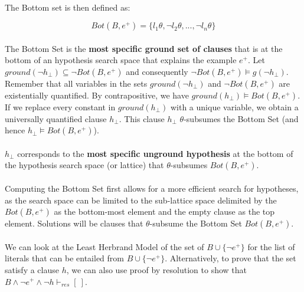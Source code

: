 \documentclass{article}
\theoremstyle{plain}
\theoremstyle{definition}
\begin{document}
\begin{multicols}{2}
\paragraph{} The Bottom set is then defined as:

$$Bot(B, e^+) = \{l_1\theta, \lnot l_2\theta, ..., \lnot l_n\theta\}$$

\paragraph{} The Bottom Set is the \textbf{most specific ground set of clauses} that is at the bottom of an hypothesis search space that explains the example $e^+$. Let $ground(\lnot h_{\perp}) \subseteq \lnot Bot(B, e^+)$ and consequently $\lnot Bot(B, e^+) \models g(\lnot h_{\perp})$. Remember that all variables in the sets $ground(\lnot h_{\perp})$ and $\lnot Bot(B, e^+)$ are existentially quantified. By contrapositive, we have $ground(h_{\perp}) \models Bot(B, e^+)$. If we replace every constant in $ground(h_{\perp})$ with a unique variable, we obtain a universally quantified clause $h_{\perp}$. This clause $h_{\perp}$ $\theta$-subsumes the Bottom Set (and hence $h_{\perp} \models Bot(B, e^+)$).

\paragraph{} $h_{\perp}$ corresponds to the \textbf{most specific unground hypothesis} at the bottom of the hypothesis search space (or lattice) that $\theta$-subsumes $Bot(B, e^+)$. 

\paragraph{} Computing the Bottom Set first allows for a more efficient search for hypotheses, as the search space can be limited to the sub-lattice space delimited by the $Bot(B, e^+)$ as the bottom-most element and the empty clause as the top element. Solutions will be clauses that $\theta$-subsume the Bottom Set $Bot(B, e^+)$.

\paragraph{} We can look at the Least Herbrand Model of the set of $B \cup \{\lnot e^+\}$ for the list of literals that can be entailed from $B \cup \{\lnot e^+\}$. Alternatively, to prove that the set satisfy a clause $h$, we can also use proof by resolution to show that $B \land \lnot e^+ \land \lnot h \vdash_{res} [\ ]$.


\end{multicols}
\end{document}
